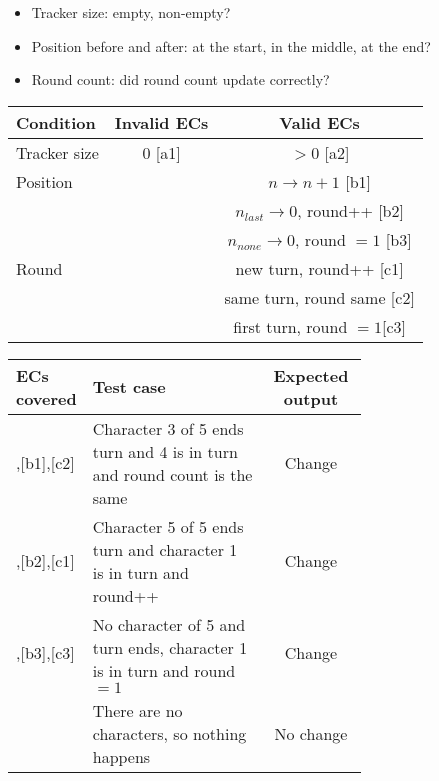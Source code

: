 \documentclass[a4paper]{article}
\newenvironment{partition}{%
\begin{center}%
\begin{tabular}{l|c|c}%
Condition & Invalid ECs & Valid ECs \\%
\hline\hline}%
{\hline\end{tabular}\end{center}}
\newenvironment{ec}{%
\begin{center}%
\begin{tabular}{p{0.2\linewidth}|p{0.5\linewidth}|c}%
ECs covered & Test case & Expected output \\%
\hline\hline}%
{\hline\end{tabular}\end{center}}
\begin{document}
\begin{itemize}
    \item Tracker size: empty, non-empty?
    \item Position before and after: at the start, in the middle, at the end?
    \item Round count: did round count update correctly?
\end{itemize}

\begin{partition}
Tracker size    & $0$ [a1] & $>0$ [a2]                          \\
Position        && $n \rightarrow n + 1$ [b1]                   \\
                && $n_{last} \rightarrow 0$, round++ [b2]       \\
                && $n_{none} \rightarrow 0$, round $=1$ [b3]    \\
Round           && new turn, round++ [c1]                       \\
                && same turn, round same [c2]                   \\
                && first turn, round $=1$[c3]                   \\
\end{partition}

\begin{ec}
[a2],[b1],[c2]  & Character 3 of 5 ends turn and 4 is in turn and round count is the same   & Change \\\hline
[a2],[b2],[c1]  & Character 5 of 5 ends turn and character 1 is in turn and round++         & Change \\\hline
[a2],[b3],[c3]  & No character of 5 and turn ends, character 1 is in turn and round $=1$    & Change \\\hline
[a1]            & There are no characters, so nothing happens & No change \\
\end{ec}
\end{document}
